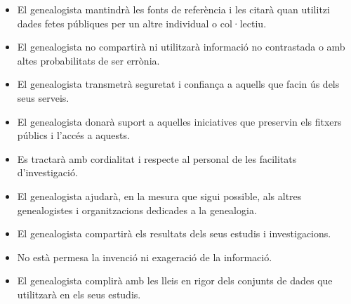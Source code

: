     \begin{itemize}
        \item El genealogista mantindrà les fonts de referència i les citarà quan utilitzi dades fetes públiques per un altre individual o col·lectiu.
        \item El genealogista no compartirà ni utilitzarà informació no contrastada o amb altes probabilitats de ser errònia.
        \item El genealogista transmetrà seguretat i confiança a aquells que facin ús dels seus serveis.
        \item El genealogista donarà suport a aquelles iniciatives que preservin els fitxers públics i l'accés a aquests.
        \item Es tractarà amb cordialitat i respecte al personal de les facilitats d'investigació.
        \item El genealogista ajudarà, en la mesura que sigui possible, als altres genealogistes i organitzacions dedicades a la genealogia.
        \item El genealogista compartirà els resultats dels seus estudis i investigacions.
        \item No està permesa la invenció ni exageració de la informació.
        \item El genealogista complirà amb les lleis en rigor dels conjunts de dades que u\-ti\-lit\-za\-rà en els seus estudis.
    \end{itemize}
